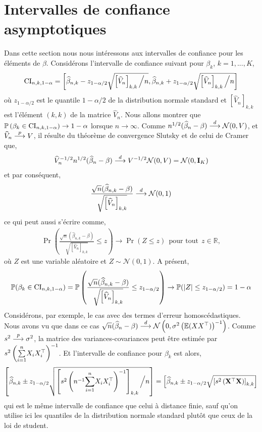 \documentclass[12pt, reqno]{amsart}
\begin{document}
\section{Intervalles de confiance asymptotiques}
Dans cette section nous nous intéressons aux intervalles de confiance pour les éléments de $\beta$. Considérons l'intervalle de confiance suivant pour $\beta_k$, $k=1,...,K$,
\begin{align*}
\mathrm{CI}_{n, k, 1-\alpha} = \left[\widehat{\beta}_{n, k} - z_{1-\alpha/2}\sqrt{\left[\widehat{V}_n\right]_{k,k} \Big{/} n}, 
\widehat{\beta}_{n, k} + z_{1-\alpha/2}\sqrt{\left[\widehat{V}_n\right]_{k,k} \Big{/} n}\right]
\end{align*}
où $ z_{1-\alpha/2}$ est le quantile $1-\alpha/2$ de la distribution normale standard et $\left[\widehat{V}_n\right]_{k,k} $ est l'élément $(k, k)$ de la matrice $\widehat{V}_n$. Nous allons montrer que ${\mathbb{P}}\left(\beta_k \in \mathrm{CI}_{n, k, 1-\alpha} \right) \rightarrow 1 - \alpha$ lorsque $n\rightarrow \infty$. Comme $n^{1/2}(\widehat{\beta}_n - \beta) \overset{d}{\longrightarrow} \mathcal{N}(0, V)$, et $\widehat{V}_n \overset{p}{\longrightarrow} V$, il résulte du théorème de convergence Slutsky et de celui de Cramer que,
\begin{align*}
\widehat{V}_n^{-1/2} n^{1/2}(\widehat{\beta}_n - \beta) \overset{d}{\longrightarrow} V^{-1/2}\mathcal{N}(0, V) = \mathcal{N}(0, \mathbf{I}_K)
\end{align*}
et par conséquent,
\begin{align*}
\frac{\sqrt{n}(\widehat{\beta}_{n, k} - \beta)}{\sqrt{\left[\widehat{V}_n\right]_{k,k} }} \overset{d}{\longrightarrow} \mathcal{N}(0, 1)
\end{align*}
ce qui peut aussi s'écrire comme,
\begin{align*}
\Pr\left(\frac{\sqrt{n}(\widehat{\beta}_{n,k} - \beta)}{\sqrt{\left[\widehat{V}_n\right]_{k,k} }} \leq z \right) \rightarrow \Pr(Z\leq z) \ \ \textrm{pour tout} \ \ z \in \mathbb{R},
\end{align*}
où $Z$ est une variable aléatoire et $Z \sim \mathcal{N}(0, 1)$. A présent,
\begin{align*}
{\mathbb{P}}(\beta_k \in \mathrm{CI}_{n, k, 1-\alpha} ) = {\mathbb{P}}\left(\frac{\sqrt{n}(\widehat{\beta}_{n,k} - \beta)}{\sqrt{\left[\widehat{V}_n\right]_{k,k} }} \leq z_{1-\alpha/2} \right) \rightarrow {\mathbb{P}}(\left\vert {Z} \right\vert \leq z_{1-\alpha/2}  ) = 1 - \alpha
\end{align*}
Considérons, par exemple, le cas avec des termes d'erreur homoscédastiques.  Nous avons vu que dans ce cas $\sqrt{n}(\widehat{\beta}_n - \beta) \overset{d}{\longrightarrow} \mathcal{N}\left(0, \sigma^2\left(\mathbb{E}(XX^\top)\right)^{-1}\right)$. Comme $s^2 \overset{p}{\longrightarrow} \sigma^2$, la matrice des variances-covariances peut être estimée par $s^2\left(\underset{i=1}{\overset{n}{\sum}} X_iX_i^\top\right)^{-1}$. Et l'intervalle de confiance pour $\beta_k$ est alors,
\begin{align*}
\left[\widehat{\beta}_{n, k} \pm  z_{1 -  \alpha/2} \sqrt{ \left[s^2\left(n^{-1}\underset{i=1}{\overset{n}{\sum}} X_iX_i^\top\right)^{-1} \right]_{k,k} \Big{/} n}\right] = \left[\widehat{\beta}_{n, k}  \pm z_{1-\alpha/2} \sqrt{\left[s^2\left(\mathbf{X}^\top\mathbf{X}\right)\right]_{k,k}}\right] 
\end{align*}
qui est le même intervalle de confiance que celui à distance finie, sauf qu'on utilise ici les quantiles de la distribution normale standard plutôt que ceux de la loi de student.
\end{document}
